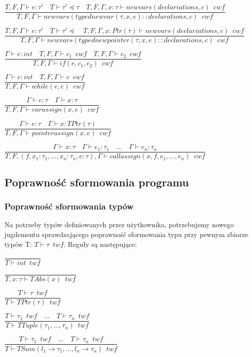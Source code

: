\documentclass{article}
\begin{document}
\centerline{$\dfrac{T, F, \Gamma \vdash e : \tau' \quad T \vdash \tau' \preceq \tau \quad T, F, \Gamma, x : \tau \vdash newvars(declariations, c) \enspace cwf}{T, F, \Gamma \vdash newvars(typednewvar(\tau, x, e) :: declarations, c) \enspace cwf  }$}\vspace{5pt}

\centerline{$\dfrac{T, F, \Gamma \vdash e : \tau' \quad T \vdash \tau' \preceq \quad T, F, \Gamma, x : Ptr(\tau) \vdash newvars(declariations, c) \enspace cwf}{T, F, \Gamma \vdash newvars(typednewpointer(\tau, x, e) :: declarations, c) \enspace cwf  }$}\vspace{5pt}

\centerline{$\dfrac{\Gamma\vdash e : int \quad T, F, \Gamma \vdash c_1 \enspace cwf \quad T, F, \Gamma \vdash c_2 \enspace cwf}{T, F, \Gamma \vdash if(e, c_1, c_2) \enspace cwf}$}\vspace{5pt}
\centerline{$\dfrac{\Gamma\vdash e : int \quad T, F, \Gamma \vdash c \enspace cwf}{T, F, \Gamma \vdash while(e, c) \enspace cwf}$}\vspace{5pt}
\centerline{$\dfrac{\Gamma\vdash e : \tau \quad \Gamma \vdash x : \tau }{T, F, \Gamma \vdash varassign(x, e) \enspace cwf}$}\vspace{5pt}
\centerline{$\dfrac{\Gamma\vdash e : \tau \quad \Gamma \vdash x : TPtr(\tau) }{T, F, \Gamma \vdash pointerassign(x, e) \enspace cwf}$}\vspace{5pt}
\centerline{$\dfrac{\Gamma \vdash x : \tau \quad \Gamma \vdash e_1 : \tau_1 \quad ... \quad \Gamma \vdash e_n : \tau_n }{T, F, (f, x_1 : \tau_1, ..., x_n : \tau_n, e : \tau), \Gamma \vdash callassign(x, f, e_1, ..., e_n) \enspace cwf}$}\vspace{5pt}
\subsection{Poprawność sformowania programu}

\subsubsection{Poprawność sformowania typów}
Na potrzeby typów definiowanych przez użytkownika, potrzebujemy nowego jugdementu sprawdzającego poprawność sformowania typu przy pewnym zbiorze typów T: $ T \vdash \tau \enspace twf$. Reguły są następujące:\newline
\centerline{$\dfrac{}{T \vdash int \enspace twf}$}\vspace{5pt}
\centerline{$\dfrac{}{T, x : \tau \vdash TAbs(x) \enspace twf}$}\vspace{5pt}
\centerline{$\dfrac{T \vdash \tau \enspace twf}{T \vdash TPtr(\tau) \enspace twf}$}\vspace{5pt}
\centerline{$\dfrac{T \vdash \tau_1 \enspace twf \quad ... \quad T \vdash \tau_n \enspace twf}{T \vdash TTuple(\tau_1, ... , \tau_n) \enspace twf}$}\vspace{5pt}
\centerline{$\dfrac{T \vdash \tau_1 \enspace twf \quad ... \quad T \vdash \tau_n \enspace twf}{T \vdash TSum(l_1 \rightarrow \tau_1, ... ,l_n \rightarrow \tau_n) \enspace twf}$}\vspace{5pt}
\end{document}
